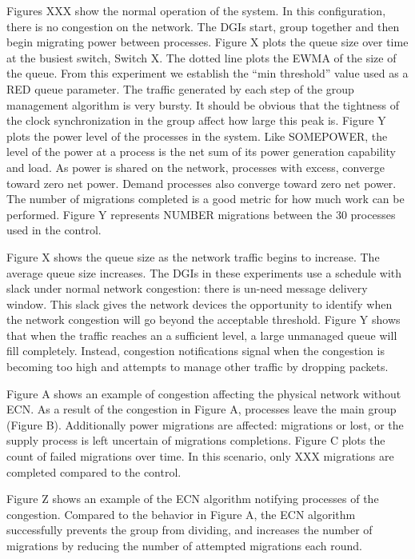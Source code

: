Figures XXX show the normal operation of the system.
In this configuration, there is no congestion on the network. 
The \ac{DGI}s start, group together and then begin migrating power between processes.
Figure X plots the queue size over time at the busiest switch, Switch X.
The dotted line plots the \ac{EWMA} of the size of the queue.
From this experiment we establish the ``min threshold'' value used as a \ac{RED} queue parameter.
The traffic generated by each step of the group management algorithm is very bursty.
It should be obvious that the tightness of the clock synchronization in the group affect how large this peak is.
Figure Y plots the power level of the processes in the system.
Like SOMEPOWER, the level of the power at a process is the net sum of its power generation capability and load.
As power is shared on the network, processes with excess, converge toward zero net power.
Demand processes also converge toward zero net power.
The number of migrations completed is a good metric for how much work can be performed.
Figure Y represents NUMBER migrations between the 30 processes used in the control.

Figure X shows the queue size as the network traffic begins to increase.
The average queue size increases.
The \ac{DGI}s in these experiments use a schedule with slack under normal network congestion: there is un-need message delivery window.
This slack gives the network devices the opportunity to identify when the network congestion will go beyond the acceptable threshold.
Figure Y shows that when the traffic reaches an a sufficient level, a large unmanaged queue will fill completely.
Instead, congestion notifications signal when the congestion is becoming too high and attempts to manage other traffic by dropping packets.

Figure A shows an example of congestion affecting the physical network without \ac{ECN}.
As a result of the congestion in Figure A, processes leave the main group (Figure B).
Additionally power migrations are affected: migrations or lost, or the supply process is left uncertain of migrations completions.
Figure C plots the count of failed migrations over time.
In this scenario, only XXX migrations are completed compared to the control.

Figure Z shows an example of the \ac{ECN} algorithm notifying processes of the congestion.
Compared to the behavior in Figure A, the \ac{ECN} algorithm successfully prevents the group from dividing, and increases the number of migrations by reducing the number of attempted migrations each round.

